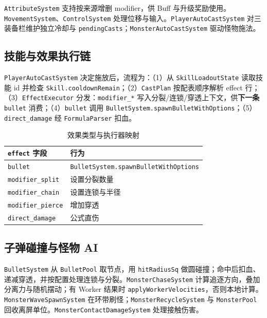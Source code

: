 \documentclass[UTF8,a4paper]{ctexart}
\begin{document}
\texttt{AttributeSystem} 支持按来源增删 modifier，供 Buff 与升级奖励使用。\texttt{MovementSystem}、\texttt{ControlSystem} 处理位移与输入。\texttt{PlayerAutoCastSystem} 对三装备栏维护独立冷却与 \texttt{pendingCasts}；\texttt{MonsterAutoCastSystem} 驱动怪物施法。

\subsection{技能与效果执行链}

\texttt{PlayerAutoCastSystem} 决定施放后，流程为：（1）从 \texttt{SkillLoadoutState} 读取技能 id 并检查 \texttt{Skill.cooldownRemain}；（2）\texttt{CastPlan} 按配表顺序解析 effect 行；（3）\texttt{EffectExecutor} 分发：\texttt{modifier\_*} 写入分裂/连锁/穿透上下文，供\textbf{下一条} \texttt{bullet} 消费；（4）\texttt{bullet} 调用 \texttt{BulletSystem.spawnBulletWithOptions}；（5）\texttt{direct\_damage} 经 \texttt{FormulaParser} 扣血。

\begin{table}[htbp]
  
  \caption{效果类型与执行器映射}
  \label{tab:effect-map}
  \begin{tabular}{ll}
    \toprule
    \texttt{effect} 字段 & 行为 \\
    \midrule
    \texttt{bullet} & \texttt{BulletSystem.spawnBulletWithOptions} \\
    \texttt{modifier\_split} & 设置分裂数量 \\
    \texttt{modifier\_chain} & 设置连锁与半径 \\
    \texttt{modifier\_pierce} & 增加穿透 \\
    \texttt{direct\_damage} & 公式直伤 \\
    \bottomrule
  \end{tabular}
\end{table}

\subsection{子弹碰撞与怪物 AI}

\texttt{BulletSystem} 从 \texttt{BulletPool} 取节点，用 \texttt{hitRadiusSq} 做圆碰撞；命中后扣血、递减穿透，并按配置处理连锁与分裂\cite{helbing2000panic}。\texttt{MonsterChaseSystem} 计算追逐方向，叠加分离力与随机摆动；有 Worker 结果时 \texttt{applyWorkerVelocities}，否则本地计算。\texttt{MonsterWaveSpawnSystem} 在环带刷怪；\texttt{MonsterRecycleSystem} 与 \texttt{MonsterPool} 回收离屏单位。\texttt{MonsterContactDamageSystem} 处理接触伤害。
\end{document}

